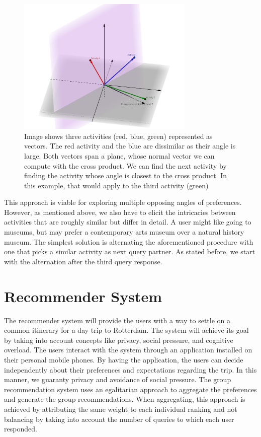 \documentclass[11pt,a4paper,oneside]{article}
\begin{document}
\begin{figure}[H]
    \centering
    \includegraphics[width=0.75\textwidth]{paper/imgs/geogebra-export.png}
    \caption{Image shows three activities (red, blue, green) represented as vectors. The red activity and the blue are dissimilar as their angle is large. Both vectors span a plane, whose normal vector we can compute with the cross product. We can find the next activity by finding the activity whose angle is closest to the cross product. In this example, that would apply to the third activity (green)}
    \label{fig:item_vectors}
\end{figure}

This approach is viable for exploring multiple opposing angles of preferences. However, as mentioned above, we also have to elicit the intricacies between activities that are roughly similar but differ in detail. A user might like going to museums, but may prefer a contemporary arts museum over a natural history museum. The simplest solution is alternating the aforementioned procedure with one that picks a similar activity as next query partner. As stated before, we start with the alternation after the third query response. 



\section{Recommender System}
\label{sec:rs}
The recommender system will provide the users with a way to settle on a common itinerary for a day trip to Rotterdam. The system will achieve its goal by taking into account concepts like privacy, social pressure, and cognitive overload. The users interact with the system through an application installed on their personal mobile phones. By having the application, the users can decide independently about their preferences and expectations regarding the trip. In this manner, we guaranty privacy and avoidance of social pressure. The group recommendation system uses an egalitarian approach to aggregate the preferences and generate the group recommendations. When aggregating, this approach is achieved by attributing the same weight to each individual ranking and not balancing by taking into account the number of queries to which each user responded.
\end{document}
